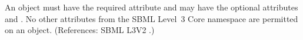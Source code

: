 An \InitialAssignment object must have the required attribute
 and may have the optional attributes   and
.  No other attributes from the SBML Level~3 Core namespace
are permitted on an \InitialAssignment object.  (References: SBML L3V2
.)
